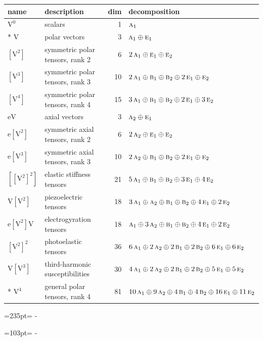 \documentclass[10pt,a4paper]{article}
\newcommand{\needspace}[1]{\par\penalty-100\begingroup\dimen0=#1\relax\dimen2=\pagegoal
  \advance\dimen2-\pagetotal\ifdim\dimen0>\dimen2\relax\ifdim\dimen2>0pt\vfil\break\fi\fi
  \endgroup}
\numberwithin{equation}{section}
\newcommand{\irr}[1]{\text{\normalfont\scshape #1}}
\newcommand{\jahn}[1]{\mathrm{#1}}
\newlength{\fillwidth}\newlength{\cellwidth}\newlength{\colwidth}
\begin{document}
{\begin{longtable}{@{}llr>{\RaggedRight\arraybackslash}p{\fillwidth}@{}}
name & description & dim & decomposition\\\midrule\endhead
\bottomrule\endfoot\endlastfoot
$\jahn{V^{0}}$ & scalars & 1 & $\irr{a}_{1}$\\*
$\jahn{V}$ & polar vectors & 3 & $\irr{a}_{1} \oplus\allowbreak \irr{e}_{1}$\\
$\jahn{[V^{2}]}$ & symmetric polar tensors, rank 2 & 6 & $2\,\irr{a}_{1} \oplus\allowbreak \irr{e}_{1} \oplus\allowbreak \irr{e}_{2}$\\
$\jahn{[V^{3}]}$ & symmetric polar tensors, rank 3 & 10 & $2\,\irr{a}_{1} \oplus\allowbreak \irr{b}_{1} \oplus\allowbreak \irr{b}_{2} \oplus\allowbreak 2\,\irr{e}_{1} \oplus\allowbreak \irr{e}_{2}$\\
$\jahn{[V^{4}]}$ & symmetric polar tensors, rank 4 & 15 & $3\,\irr{a}_{1} \oplus\allowbreak \irr{b}_{1} \oplus\allowbreak \irr{b}_{2} \oplus\allowbreak 2\,\irr{e}_{1} \oplus\allowbreak 3\,\irr{e}_{2}$\\
$\jahn{eV}$ & axial vectors & 3 & $\irr{a}_{2} \oplus\allowbreak \irr{e}_{1}$\\
$\jahn{e[V^{2}]}$ & symmetric axial tensors, rank 2 & 6 & $2\,\irr{a}_{2} \oplus\allowbreak \irr{e}_{1} \oplus\allowbreak \irr{e}_{2}$\\
$\jahn{e[V^{3}]}$ & symmetric axial tensors, rank 3 & 10 & $2\,\irr{a}_{2} \oplus\allowbreak \irr{b}_{1} \oplus\allowbreak \irr{b}_{2} \oplus\allowbreak 2\,\irr{e}_{1} \oplus\allowbreak \irr{e}_{2}$\\
$\jahn{[[V^{2}]^{2}]}$ & elastic stiffness tensors & 21 & $5\,\irr{a}_{1} \oplus\allowbreak \irr{b}_{1} \oplus\allowbreak \irr{b}_{2} \oplus\allowbreak 3\,\irr{e}_{1} \oplus\allowbreak 4\,\irr{e}_{2}$\\
$\jahn{V[V^{2}]}$ & piezoelectric tensors & 18 & $3\,\irr{a}_{1} \oplus\allowbreak \irr{a}_{2} \oplus\allowbreak \irr{b}_{1} \oplus\allowbreak \irr{b}_{2} \oplus\allowbreak 4\,\irr{e}_{1} \oplus\allowbreak 2\,\irr{e}_{2}$\\
$\jahn{e[V^{2}]V}$ & electrogyration tensors & 18 & $\irr{a}_{1} \oplus\allowbreak 3\,\irr{a}_{2} \oplus\allowbreak \irr{b}_{1} \oplus\allowbreak \irr{b}_{2} \oplus\allowbreak 4\,\irr{e}_{1} \oplus\allowbreak 2\,\irr{e}_{2}$\\
$\jahn{[V^{2}]^{2}}$ & photoelastic tensors & 36 & $6\,\irr{a}_{1} \oplus\allowbreak 2\,\irr{a}_{2} \oplus\allowbreak 2\,\irr{b}_{1} \oplus\allowbreak 2\,\irr{b}_{2} \oplus\allowbreak 6\,\irr{e}_{1} \oplus\allowbreak 6\,\irr{e}_{2}$\\
$\jahn{V[V^{3}]}$ & third-harmonic susceptibilities & 30 & $4\,\irr{a}_{1} \oplus\allowbreak 2\,\irr{a}_{2} \oplus\allowbreak 2\,\irr{b}_{1} \oplus\allowbreak 2\,\irr{b}_{2} \oplus\allowbreak 5\,\irr{e}_{1} \oplus\allowbreak 5\,\irr{e}_{2}$\\*
$\jahn{V^{4}}$ & general polar tensors, rank 4 & 81 & $10\,\irr{a}_{1} \oplus\allowbreak 9\,\irr{a}_{2} \oplus\allowbreak 4\,\irr{b}_{1} \oplus\allowbreak 4\,\irr{b}_{2} \oplus\allowbreak 16\,\irr{e}_{1} \oplus\allowbreak 11\,\irr{e}_{2}$\\
\bottomrule\end{longtable}}
\needspace{235pt}
\needspace{103pt}
\end{document}
